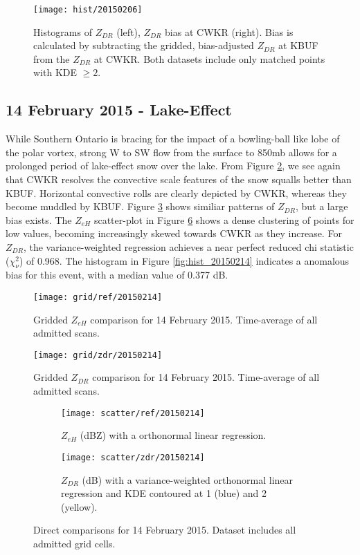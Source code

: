 \begin{figure}[H]
\texttt{[image: hist/20150206]}\centering
\caption{Histograms of $Z_{DR}$ (left), $Z_{DR}$ bias at CWKR (right). Bias is calculated by subtracting the gridded, bias-adjusted $Z_{DR}$ at KBUF from the
$Z_{DR}$ at CWKR. Both datasets include only matched points with KDE $\geq 2$.} 
\label{fig:hist_20150206}
\end{figure}

\subsection{14 February 2015 - Lake-Effect}
While Southern Ontario is bracing for the impact of a bowling-ball like lobe of the polar vortex, strong W to SW flow from the surface to 850mb allows for a prolonged period of lake-effect snow over the lake. From Figure \ref{fig:grid_ref_20150214}, we see again that CWKR resolves the convective scale features of the snow squalls better than KBUF. Horizontal convective rolls are clearly depicted by CWKR, whereas they become muddled by KBUF. Figure \ref{fig:grid_zdr_20150214} shows similiar patterns of $Z_{DR}$, but a large bias exists. The $Z_{eH}$ scatter-plot in Figure \ref{fig:scatter_20150214} shows a dense clustering of points for low values, becoming increasingly skewed towards CWKR as they increase. For $Z_{DR}$, the variance-weighted regression achieves a near perfect reduced chi statistic ($\chi^2_\nu$) of 0.968. The histogram in Figure \ref{fig:hist_20150214} indicates a anomalous bias for this event, with a median value of 0.377 dB.

\begin{figure}[p]
\texttt{[image: grid/ref/20150214]}
\caption{Gridded $Z_{eH}$ comparison for 14 February 2015. Time-average of all admitted scans.} 
\label{fig:grid_ref_20150214}
\end{figure}

\begin{figure}[p]
\texttt{[image: grid/zdr/20150214]}
\caption{Gridded $Z_{DR}$ comparison for 14 February 2015. Time-average of all admitted scans.} 
\label{fig:grid_zdr_20150214}
\end{figure}

\begin{figure}[p]
\centering
   \begin{subfigure}[t]{0.48\linewidth} \centering
     \texttt{[image: scatter/ref/20150214]}
     \caption{$Z_{eH}$ (dBZ) with a orthonormal linear regression.}\label{fig:scatter_ref_20150214}
   \end{subfigure}
   \begin{subfigure}[t]{0.48\linewidth} \centering
     \texttt{[image: scatter/zdr/20150214]}
     \caption{$Z_{DR}$ (dB) with a variance-weighted orthonormal linear regression and KDE contoured at 1 (blue) and 2 (yellow).}\label{fig:scatter_zdr_20150214}
   \end{subfigure}
\caption{Direct comparisons for 14 February 2015. Dataset includes all admitted grid cells.} \label{fig:scatter_20150214}
\end{figure}

